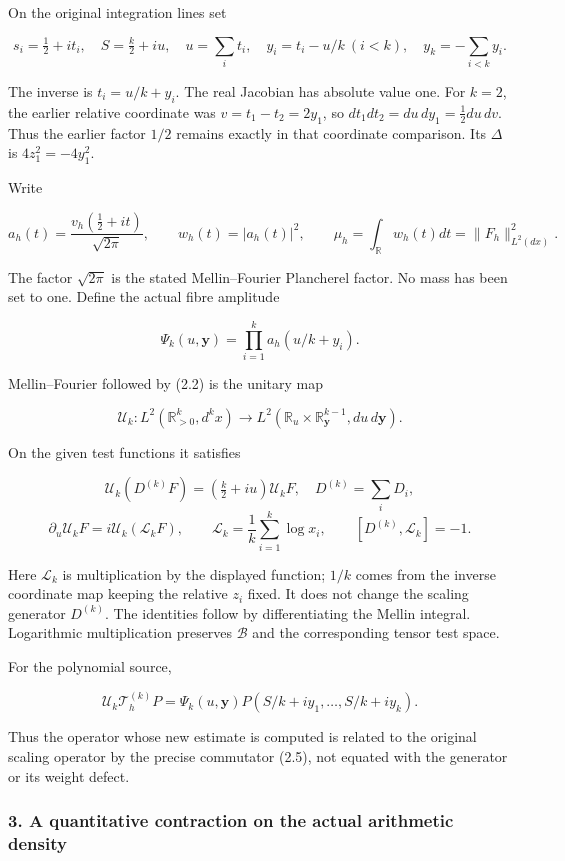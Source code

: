 On the original integration lines set

\[s_i=\tfrac12+it_i,\quad S=\tfrac{k}{2}+iu,\quad u=\sum_i t_i,\quad y_i=t_i-u/k\ (i<k),\quad y_k=-\sum_{i<k}y_i.\tag{2.2}\]

The inverse is \(t_i=u/k+y_i\). The real Jacobian has absolute value
one. For \(k=2\), the earlier relative coordinate was
\(v=t_1-t_2=2y_1\), so \(dt_1dt_2=du\,dy_1=\tfrac12du\,dv\). Thus the
earlier factor \(1/2\) remains exactly in that coordinate comparison.
Its \(\Delta\) is \(4z_1^2=-4y_1^2\).

Write

\[a_h(t)=\frac{v_h(\tfrac12+it)}{\sqrt{2\pi}},\qquad w_h(t)=|a_h(t)|^2,\qquad \mu_h=\int_{\mathbb R}w_h(t)dt=\|F_h\|_{L^2(dx)}^2.\tag{2.3}\]

The factor \(\sqrt{2\pi}\) is the stated Mellin--Fourier Plancherel
factor. No mass has been set to one. Define the actual fibre amplitude

\[\Psi_k(u,\mathbf y)=\prod_{i=1}^k a_h(u/k+y_i).\tag{2.4}\]

Mellin--Fourier followed by (2.2) is the unitary map

\[\mathscr U_k:L^2(\mathbb R_{>0}^k,d^kx)\longrightarrow L^2(\mathbb R_u\times\mathbb R_{\mathbf y}^{k-1},du\,d\mathbf y).\]

On the given test functions it satisfies

\[\mathscr U_k(D^{(k)}F)=(\tfrac{k}{2}+iu)\mathscr U_kF,\quad D^{(k)}=\sum_iD_i,\]
\[\partial_u\mathscr U_kF=i\mathscr U_k(\mathscr L_kF),\qquad \mathscr L_k=\frac1k\sum_{i=1}^k\log x_i,\qquad [D^{(k)},\mathscr L_k]=-1.\tag{2.5}\]

Here \(\mathscr L_k\) is multiplication by the displayed function;
\(1/k\) comes from the inverse coordinate map keeping the relative
\(z_i\) fixed. It does not change the scaling generator \(D^{(k)}\). The
identities follow by differentiating the Mellin integral. Logarithmic
multiplication preserves \(\mathscr B\) and the corresponding tensor
test space.

For the polynomial source,

\[\mathscr U_k\mathcal T_h^{(k)}P=\Psi_k(u,\mathbf y)P(S/k+i y_1,\ldots,S/k+i y_k).\tag{2.6}\]

Thus the operator whose new estimate is computed is related to the
original scaling operator by the precise commutator (2.5), not equated
with the generator or its weight defect.

\subsubsection{3. A quantitative contraction on the actual arithmetic
density}\label{sum_connection:a-quantitative-contraction-on-the-actual-arithmetic-density}

